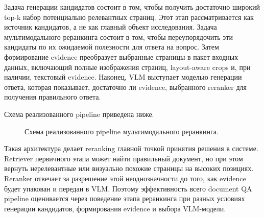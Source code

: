 \documentclass[conference]{IEEEtran}
\begin{document}
Задача генерации кандидатов состоит в том, чтобы получить достаточно широкий top-k набор потенциально релевантных страниц. Этот этап рассматривается как источник кандидатов, а не как главный объект исследования. Задача мультимодального реранкинга состоит в том, чтобы переупорядочить эти кандидаты по их ожидаемой полезности для ответа на вопрос. Затем формирование evidence преобразует выбранные страницы в пакет входных данных, включающий полные изображения страниц, layout-aware crops и, при наличии, текстовый evidence. Наконец, VLM выступает моделью генерации ответа, которая показывает, достаточно ли evidence, выбранного reranker для получения правильного ответа.

Схема реализованного pipeline приведена ниже.

\begin{figure}[t]
\centering
{}
\caption{Схема реализованного pipeline мультимодального реранкинга.}
\label{fig:pipeline}
\end{figure}

Такая архитектура делает reranking главной точкой принятия решения в системе. Retriever первичного этапа может найти правильный документ, но при этом вернуть нерелевантные или визуально похожие страницы на высоких позициях. Reranker отвечает за разрешение этой неоднозначности до того, как evidence будет упакован и передан в VLM. Поэтому эффективность всего document QA pipeline оценивается через поведение этапа реранкинга при разных условиях генерации кандидатов, формирования evidence и выбора VLM-модели.
\end{document}
